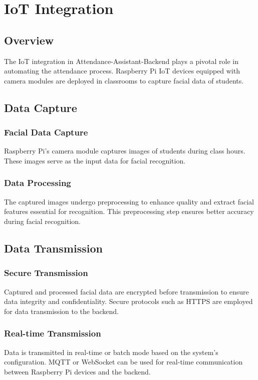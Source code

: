 \documentclass[conference]{IEEEtran}
\begin{document}
\section{IoT Integration}
\subsection{Overview}
The IoT integration in Attendance-Assistant-Backend plays a pivotal role in automating the attendance process. Raspberry Pi IoT devices equipped with camera modules are deployed in classrooms to capture facial data of students.

\subsection{Data Capture}
\subsubsection{Facial Data Capture}
Raspberry Pi's camera module captures images of students during class hours. These images serve as the input data for facial recognition.

\subsubsection{Data Processing}
The captured images undergo preprocessing to enhance quality and extract facial features essential for recognition. This preprocessing step ensures better accuracy during facial recognition.

\subsection{Data Transmission}
\subsubsection{Secure Transmission}
Captured and processed facial data are encrypted before transmission to ensure data integrity and confidentiality. Secure protocols such as HTTPS are employed for data transmission to the backend.

\subsubsection{Real-time Transmission}
Data is transmitted in real-time or batch mode based on the system's configuration. MQTT or WebSocket can be used for real-time communication between Raspberry Pi devices and the backend.
\end{document}
